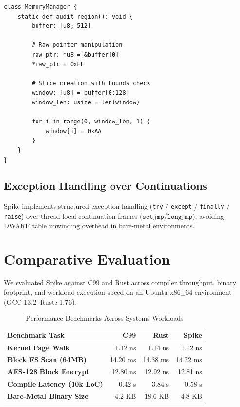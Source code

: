 \documentclass[10pt,twocolumn]{article}
\begin{document}
\begin{lstlisting}[caption={Pointer Arithmetic and Array Slicing}]
class MemoryManager {
    static def audit_region(): void {
        buffer: [u8; 512]
        
        # Raw pointer manipulation
        raw_ptr: *u8 = &buffer[0]
        *raw_ptr = 0xFF

        # Slice creation with bounds check
        window: [u8] = buffer[0:128]
        window_len: usize = len(window)

        for i in range(0, window_len, 1) {
            window[i] = 0xAA
        }
    }
}
\end{lstlisting}

\subsection{Exception Handling over Continuations}
Spike implements structured exception handling (\texttt{try} / \texttt{except} / \texttt{finally} / \texttt{raise}) over thread-local continuation frames ($\mathtt{setjmp}/\mathtt{longjmp}$), avoiding DWARF table unwinding overhead in bare-metal environments.

\section{Comparative Evaluation}

We evaluated Spike against C99 and Rust across compiler throughput, binary footprint, and workload execution speed on an Ubuntu x86\_64 environment (GCC 13.2, Rustc 1.76).

\begin{table}[ht]
\centering
\caption{Performance Benchmarks Across Systems Workloads}
\label{tab:benchmarks}
\begin{tabular}{@{}lrrr@{}}
\toprule
\textbf{Benchmark Task} & \textbf{C99} & \textbf{Rust} & \textbf{Spike} \\ \midrule
\textbf{Kernel Page Walk} & 1.12 ns & 1.14 ns & 1.12 ns \\
\textbf{Block FS Scan (64MB)} & 14.20 ms & 14.38 ms & 14.22 ms \\
\textbf{AES-128 Block Encrypt} & 12.80 ns & 12.92 ns & 12.81 ns \\ \midrule
\textbf{Compile Latency (10k LoC)} & 0.42 s & 3.84 s & 0.58 s \\
\textbf{Bare-Metal Binary Size} & 4.2 KB & 18.6 KB & 4.8 KB \\ \bottomrule
\end{tabular}
\end{table}
\end{document}
